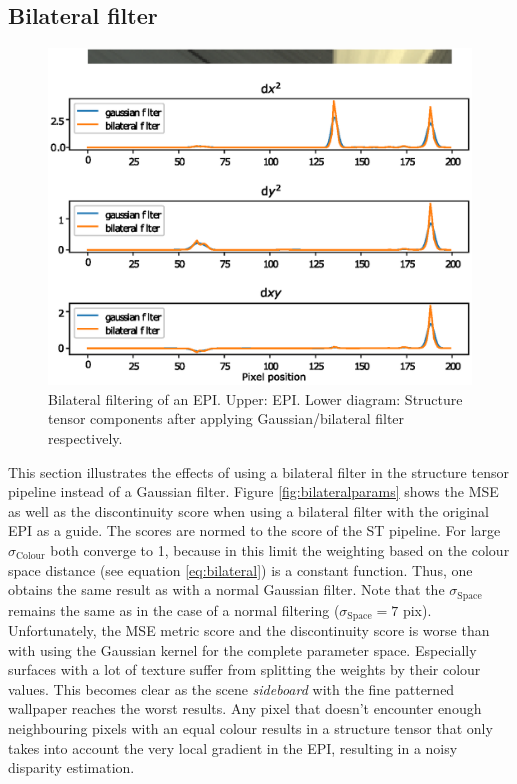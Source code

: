 \documentclass  [
  paper    = a4,
  BCOR     = 10mm,
  twoside,
  fontsize = 12pt,
  fleqn,
  toc      = bibnumbered,
  toc      = listofnumbered,
  numbers  = noendperiod,
  headings = normal,
  listof   = leveldown,
  version  = 3.03
]                                       {scrreprt}
\begin{document}
\subsection{Bilateral filter}
\begin{figure}[h!]
	\centering
	\includegraphics[width=0.7\linewidth]{images/bilat}
	\caption[Bilateral filtering]{Bilateral filtering of an EPI. Upper: EPI. Lower diagram: Structure tensor components after applying Gaussian/bilateral filter respectively.}
	\label{fig:bilat}
\end{figure}
 This section illustrates the effects of using a bilateral filter in the structure tensor pipeline instead of a Gaussian filter. Figure \ref{fig:bilateralparams} shows the MSE as well as the discontinuity score when using a bilateral filter with the original EPI as a guide. The scores are normed to the score of the ST pipeline. For large $\sigma_\text{Colour}$ both converge to 1, because in this limit the weighting based on the colour space distance (see equation \ref{eq:bilateral}) is a constant function. Thus, one obtains the same result as with a normal Gaussian filter. Note that the $\sigma_\text{Space}$ remains the same as in the case of a normal filtering ($\sigma_\text{Space}=7$ pix). Unfortunately, the MSE metric score and the discontinuity score is worse than with using the Gaussian kernel for the complete parameter space. Especially surfaces with a lot of texture suffer from splitting the weights by their colour values. This becomes clear as the scene \textit{sideboard} with the fine patterned wallpaper reaches the worst results. Any pixel that doesn't encounter enough neighbouring pixels with an equal colour results in a  structure tensor that only takes into account the very local gradient in the EPI, resulting in a noisy disparity estimation.\\
\end{document}
